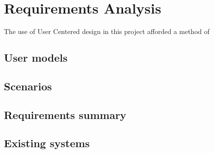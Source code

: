 \chapter{Requirements Analysis}\label{C:ra}
The use of User Centered design in this project afforded a method of
\section{User models}

\section{Scenarios}

\section{Requirements summary}

\section{Existing systems}